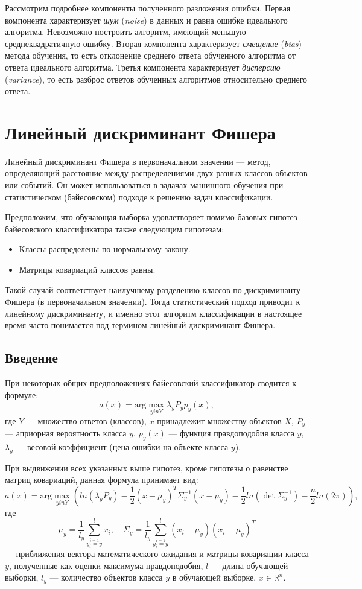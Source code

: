 Рассмотрим подробнее компоненты полученного разложения ошибки. Первая компонента характеризует \emph{шум} (\emph{noise}) в данных и равна ошибке идеального алгоритма. Невозможно построить алгоритм, имеющий меньшую среднеквадратичную ошибку. Вторая компонента характеризует \emph{смещение} (\emph{bias}) метода обучения, то есть отклонение среднего ответа обученного алгоритма от ответа идеального алгоритма. Третья компонента характеризует \emph{дисперсию} (\emph{variance}), то есть разброс ответов обученных алгоритмов относительно среднего ответа.

\section*{Линейный дискриминант Фишера}

Линейный дискриминант Фишера в первоначальном значении — метод, определяющий расстояние между распределениями двух разных классов объектов или событий. Он может использоваться в задачах машинного обучения при статистическом (байесовском) подходе к решению задач классификации.

Предположим, что обучающая выборка удовлетворяет помимо базовых гипотез байесовского классификатора также следующим гипотезам:
\begin{itemize}
    \item Классы распределены по нормальному закону.
    \item Матрицы ковариаций классов равны.
\end{itemize}

Такой случай соответствует наилучшему разделению классов по дискриминанту Фишера (в первоначальном значении). Тогда статистический подход приводит к линейному дискриминанту, и именно этот алгоритм классификации в настоящее время часто понимается под термином линейный дискриминант Фишера.

\subsection*{Введение}

При некоторых общих предположениях байесовский классификатор сводится к формуле:
\[
a(x) = \mathrm{arg}\max_{yin Y} \lambda_{y} P_y p_y(x),
\]
где $Y$ — множество ответов (классов), $x$ принадлежит множеству объектов $X$, $P_y$ — априорная вероятность класса $y$, $p_y(x)$ — функция правдоподобия класса $y$, $\lambda_{y}$ — весовой коэффициент (цена ошибки на объекте класса $y$).

При выдвижении всех указанных выше гипотез, кроме гипотезы о равенстве матриц ковариаций, данная формула принимает вид:
\[
a(x) = \mathrm{arg}\max_{yin Y} \left( ln(\lambda_{y} P_y) - \frac{1}{2}(x - \mu_y)^T \Sigma^{-1}_{y} (x - \mu_y) - \frac{1}{2}ln(\det{\Sigma^{-1}_{y}}) - \frac{n}{2}ln(2\pi) \right),
\]
где
\[
\mu_y = \frac{1}{l_y} \sum^{l}_{\stackrel{i=1}{y_i = y}}x_i, \quad
\Sigma_y = \frac{1}{l_y} \sum^{l}_{\stackrel{i=1}{y_i = y}}(x_i - \mu_y)(x_i - \mu_y)^T
\]
— приближения вектора математического ожидания и матрицы ковариации класса $y$, полученные как оценки максимума правдоподобия, $l$ — длина обучающей выборки, $l_y$ — количество объектов класса $y$ в обучающей выборке, $x \in \mathbb{R}^n$.

